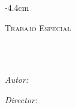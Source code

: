 \begin{titlepage}
    \begin{addmargin}[-0.6cm]{-4.4cm}
    \begin{center}

    \vspace*{.06\textheight}
    {\scshape\LARGE \myUni\par}\vspace{1.5cm} %
    \textsc{\Large Trabajo Especial}\\[0.5cm] %

    \HRule \\[0.4cm] %
    {\Large \bfseries \spacedallcaps{\myTitle}\par}\vspace{0.4cm} %
    \HRule \\[1.5cm] %

    \begin{minipage}[t]{0.4\textwidth}
    \begin{flushleft} \large
    \emph{Autor:}\\
    \href{https://www.famaf.unc.edu.ar/~mdemayo366/}{\myName} %
    \end{flushleft}
    \end{minipage}
    \begin{minipage}[t]{0.4\textwidth}
    \begin{flushright} \large
    \emph{Director:} \\
    \href{https://cs.famaf.unc.edu.ar/~nicolasw/}{\mySupervisor} %
    \end{flushright}
    \end{minipage}\\[2cm]

    \large \textit{\myDegree}\\[0.5cm] %
    \myUni\\ \myLocation\\[2cm] %


\end{center}
\end{addmargin}
\end{titlepage}
